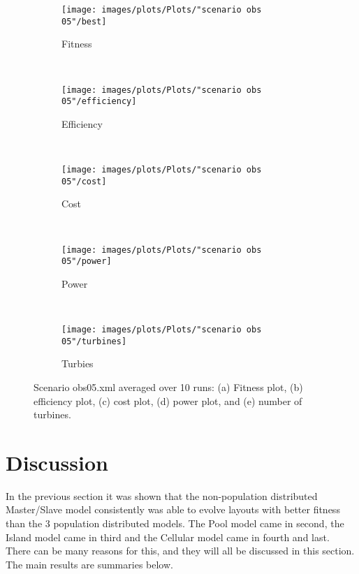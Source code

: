 \begin{figure}[h!]
    \centering
      \begin{subfigure}[b]{0.45\textwidth}
        \texttt{[image: images/plots/Plots/"scenario obs 05"/best]}
        \caption{Fitness}
        \hfill
        \label{plot:fitness plot scenario obs 05}
    \end{subfigure}
    ~
      \begin{subfigure}[b]{0.45\textwidth}
        \texttt{[image: images/plots/Plots/"scenario obs 05"/efficiency]}
        \caption{Efficiency}
        \hfill
        \label{plot:efficiency plot scenario obs 05}
    \end{subfigure}
    ~
    \begin{subfigure}[b]{0.45\textwidth}
        \texttt{[image: images/plots/Plots/"scenario obs 05"/cost]}
        \caption{Cost}
        \hfill
        \label{plot:cost plot scenario obs 05}
    \end{subfigure}
    ~
    \begin{subfigure}[b]{0.45\textwidth}
        \texttt{[image: images/plots/Plots/"scenario obs 05"/power]}
        \caption{Power}
        \hfill
        \label{plot:power plot scenario obs 05}
    \end{subfigure}
    ~
    \begin{subfigure}[b]{0.45\textwidth}
        \texttt{[image: images/plots/Plots/"scenario obs 05"/turbines]}
        \caption{Turbies}
        \hfill
        \label{plot:turbines plot scenario obs 05}
    \end{subfigure}
    \caption{Scenario obs05.xml averaged over 10 runs: (a) Fitness plot, (b) efficiency plot, (c) cost plot, (d) power plot, and (e) number of turbines.}
    \label{plot:scenario obs 05}
\end{figure}


\section{Discussion}\label{section:discussion}
\noindent In the previous section it was shown that the non-population distributed Master/Slave model consistently was able to evolve layouts with better fitness than the 3 population distributed models. The Pool model came in second, the Island model came in third and the Cellular model came in fourth and last. There can be many reasons for this, and they will all be discussed in this section. The main results are summaries below.\\

